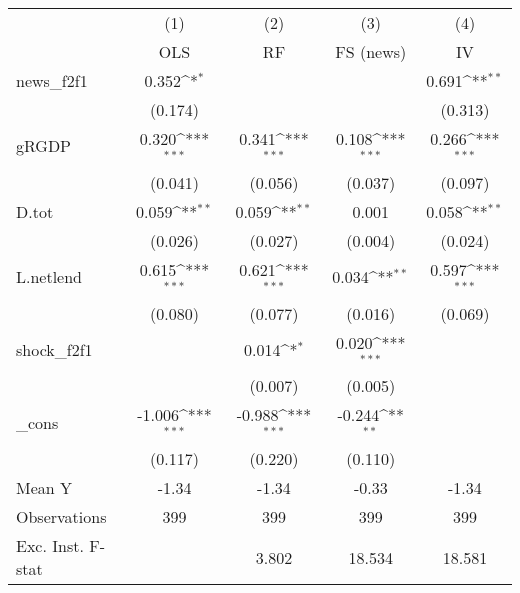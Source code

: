 {
\def\sym#1{\ifmmode^{#1}\else\(^{#1}\)\fi}
\begin{tabular}{l*{4}{c}}
\toprule
            &\multicolumn{1}{c}{(1)}&\multicolumn{1}{c}{(2)}&\multicolumn{1}{c}{(3)}&\multicolumn{1}{c}{(4)}\\
            &\multicolumn{1}{c}{OLS}&\multicolumn{1}{c}{RF}&\multicolumn{1}{c}{FS (news)}&\multicolumn{1}{c}{IV}\\
\midrule
news\_f2f1   &       0.352\sym{*}  &                     &                     &       0.691\sym{**} \\
            &     (0.174)         &                     &                     &     (0.313)         \\
\addlinespace
gRGDP       &       0.320\sym{***}&       0.341\sym{***}&       0.108\sym{***}&       0.266\sym{***}\\
            &     (0.041)         &     (0.056)         &     (0.037)         &     (0.097)         \\
\addlinespace
D.tot       &       0.059\sym{**} &       0.059\sym{**} &       0.001         &       0.058\sym{**} \\
            &     (0.026)         &     (0.027)         &     (0.004)         &     (0.024)         \\
\addlinespace
L.netlend   &       0.615\sym{***}&       0.621\sym{***}&       0.034\sym{**} &       0.597\sym{***}\\
            &     (0.080)         &     (0.077)         &     (0.016)         &     (0.069)         \\
\addlinespace
shock\_f2f1  &                     &       0.014\sym{*}  &       0.020\sym{***}&                     \\
            &                     &     (0.007)         &     (0.005)         &                     \\
\addlinespace
\_cons      &      -1.006\sym{***}&      -0.988\sym{***}&      -0.244\sym{**} &                     \\
            &     (0.117)         &     (0.220)         &     (0.110)         &                     \\
\midrule
Mean Y      &       -1.34         &       -1.34         &       -0.33         &       -1.34         \\
Observations&         399         &         399         &         399         &         399         \\
Exc. Inst. F-stat&                     &       3.802         &      18.534         &      18.581         \\
\bottomrule
\end{tabular}
}
